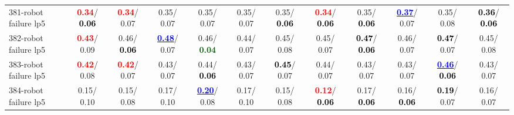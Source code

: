 \begin{table}[h]
\begin{center}
{\begin{tabular}{lc|c|c|c|c|c|c|c|c|c|c}
381-robot failure lp5 & \textcolor{red}{\textbf{  0.34}}/\textcolor{black}{\textbf{  0.06}} & \textcolor{red}{\textbf{  0.34}}/  0.07 &   0.35/  0.07 &   0.35/  0.07 &   0.35/  0.07 &   0.35/\textcolor{black}{\textbf{  0.06}} & \textcolor{red}{\textbf{  0.34}}/\textcolor{black}{\textbf{  0.06}} &   0.35/\textcolor{black}{\textbf{  0.06}} & \underline{\textcolor{blue}{\textbf{  0.37}}}/  0.07 &   0.35/  0.08 & \textcolor{black}{\textbf{  0.36}}/\textcolor{black}{\textbf{  0.06}} \\
382-robot failure lp5 & \textcolor{red}{\textbf{  0.43}}/  0.09 &   0.46/\textcolor{black}{\textbf{  0.06}} & \underline{\textcolor{blue}{\textbf{  0.48}}}/  0.07 &   0.46/\textcolor{darkgreen}{\textbf{  0.04}} &   0.44/  0.07 &   0.45/  0.08 &   0.45/  0.07 & \textcolor{black}{\textbf{  0.47}}/\textcolor{black}{\textbf{  0.06}} &   0.46/  0.07 & \textcolor{black}{\textbf{  0.47}}/  0.07 &   0.45/  0.08 \\
383-robot failure lp5 & \textcolor{red}{\textbf{  0.42}}/  0.08 & \textcolor{red}{\textbf{  0.42}}/  0.07 &   0.43/  0.07 &   0.44/\textcolor{black}{\textbf{  0.06}} &   0.43/  0.07 & \textcolor{black}{\textbf{  0.45}}/  0.07 &   0.44/  0.07 &   0.43/  0.07 &   0.43/  0.07 & \underline{\textcolor{blue}{\textbf{  0.46}}}/\textcolor{black}{\textbf{  0.06}} &   0.43/  0.07 \\
384-robot failure lp5 &   0.15/  0.10 &   0.15/  0.08 &   0.17/  0.10 & \underline{\textcolor{blue}{\textbf{  0.20}}}/  0.08 &   0.17/  0.10 &   0.15/  0.08 & \textcolor{red}{\textbf{  0.12}}/\textcolor{black}{\textbf{  0.06}} &   0.17/\textcolor{black}{\textbf{  0.06}} &   0.16/\textcolor{black}{\textbf{  0.06}} & \textcolor{black}{\textbf{  0.19}}/  0.07 &   0.16/  0.07 \\\end{tabular}}\label{stratsALCKappa11AllReduxa}
\end{center}
\end{table}
